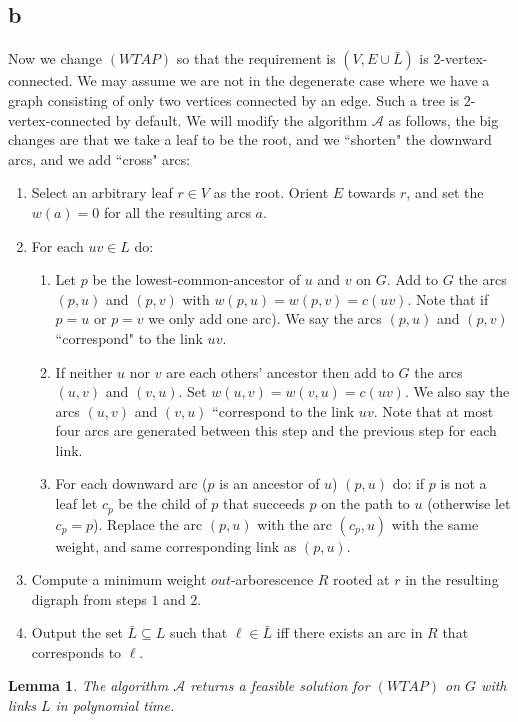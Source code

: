 \documentclass[letterpaper,12pt,oneside,onecolumn]{article}
\newcommand{\cA}{\mathcal{A}} \newcommand{\cB}{\mathcal{B}}
\newtheorem{lemma}[fact]{Lemma}
\begin{document}
\subsection{b}
\paragraph{}
Now we change $(WTAP)$ so that the requirement is $(V, E\cup \bar{L})$ is $2$-vertex-connected. We may assume we are not in the degenerate case where we have a graph consisting of only two vertices connected by an edge. Such a tree is $2$-vertex-connected by default. We will modify the algorithm $\cA$ as follows, the big changes are that we take a leaf to be the root, and we ``shorten" the downward arcs, and we add ``cross" arcs:
\begin{enumerate}
\item Select an arbitrary leaf $r \in V$ as the root. Orient $E$ towards $r$, and set the $w(a) = 0$ for all the resulting arcs $a$.
\item For each $uv \in L$ do:
	\begin{enumerate}
	\item Let $p$ be the lowest-common-ancestor of $u$ and $v$ on $G$. Add to $G$ the arcs $(p,u)$ and $(p,v)$ with $w(p,u) = w(p,v) = c(uv)$. Note that if $p=u$ or $p=v$ we only add one arc). We say the arcs $(p,u)$ and $(p,v)$ ``correspond" to the link $uv$.
	\item If neither $u$ nor $v$ are each others' ancestor then  add to $G$ the arcs $(u,v)$ and $(v,u)$. Set $w(u,v) = w(v,u) = c(uv)$. We also say the arcs $(u,v)$ and $(v,u)$ ``correspond to the link $uv$. Note that at most four arcs are generated between this step and the previous step for each link.
	\item For each downward arc ($p$ is an ancestor of $u$) $(p,u)$ do: if $p$ is not a leaf let $c_p$ be the child of $p$  that succeeds $p$ on the path to $u$ (otherwise let $c_p = p$). Replace the arc $(p,u)$ with the arc $(c_p, u)$ with the same weight, and same corresponding link as $(p,u)$.
	\end{enumerate}
\item Compute a minimum weight $out$-arborescence $R$ rooted at $r$ in the resulting digraph from steps $1$ and $2$.
\item Output the set $\bar{L} \subseteq L$ such that $\ell \in \bar{L}$ iff there exists an arc in $R$ that corresponds to $\ell$.
\end{enumerate}
\begin{lemma}\label{lemma:3b-poly}
The algorithm $\cA$ returns a feasible solution for $(WTAP)$ on $G$ with links $L$ in polynomial time.
\end{lemma}
\end{document}
